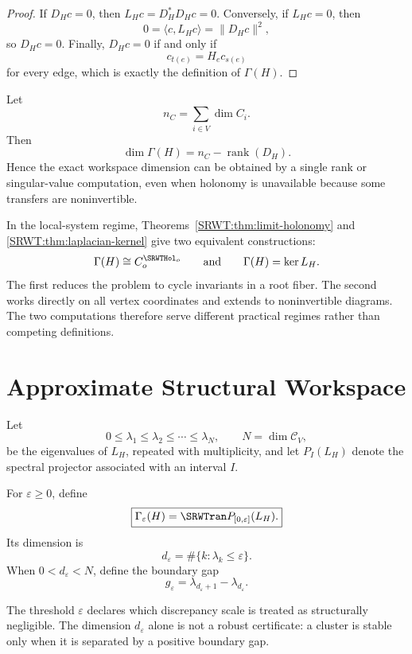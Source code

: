 \begin{proof}
If \(D_Hc=0\), then \(L_Hc=D_H^*D_Hc=0\). Conversely, if \(L_Hc=0\), then
\[
0=\langle c,L_Hc\rangle=\|D_Hc\|^2,
\]
so \(D_Hc=0\). Finally, \(D_Hc=0\) if and only if
\[
c_{t(e)}=H_ec_{s(e)}
\]
for every edge, which is exactly the definition of \(\Gamma(H)\).
\end{proof}

\begin{SRWTcorollary}\label{SRWT:cor:workspace-rank-D}
Let
\[
n_C=\sum_{i\in V}\dim C_i.
\]
Then
\[
\boxed{
\dim\Gamma(H)=n_C-\operatorname{rank}(D_H).
}
\]
Hence the exact workspace dimension can be obtained by a single rank or
singular-value computation, even when holonomy is unavailable because some
transfers are noninvertible.
\end{SRWTcorollary}


In the local-system regime, Theorems~\ref{SRWT:thm:limit-holonomy} and
\ref{SRWT:thm:laplacian-kernel} give two equivalent constructions:
\[
\Gamma(H)
\cong
C_o^{\SRWTHol_o}
\qquad\text{and}\qquad
\Gamma(H)=\ker L_H.
\]
The first reduces the problem to cycle invariants in a root fiber. The second
works directly on all vertex coordinates and extends to noninvertible diagrams.
The two computations therefore serve different practical regimes rather than
competing definitions.

\section{Approximate Structural Workspace}

Let
\[
0\leq\lambda_1\leq\lambda_2\leq\cdots\leq\lambda_N,
\qquad
N=\dim\mathcal C_V,
\]
be the eigenvalues of \(L_H\), repeated with multiplicity, and let
\(P_I(L_H)\) denote the spectral projector associated with an interval \(I\).

\begin{SRWTdefinition}\label{SRWT:def:threshold-workspace}
For \(\varepsilon\geq0\), define
\[
\boxed{
\Gamma_\varepsilon(H)
=
\SRWTran P_{[0,\varepsilon]}(L_H).
}
\]
Its dimension is
\[
d_\varepsilon
=
\#\{k:\lambda_k\leq\varepsilon\}.
\]
When \(0<d_\varepsilon<N\), define the boundary gap
\[
\boxed{
g_\varepsilon
=
\lambda_{d_\varepsilon+1}-\lambda_{d_\varepsilon}.
}
\]
\end{SRWTdefinition}

The threshold \(\varepsilon\) declares which discrepancy scale is treated as
structurally negligible. The dimension \(d_\varepsilon\) alone is not a
robust certificate: a cluster is stable only when it is separated by a
positive boundary gap.

